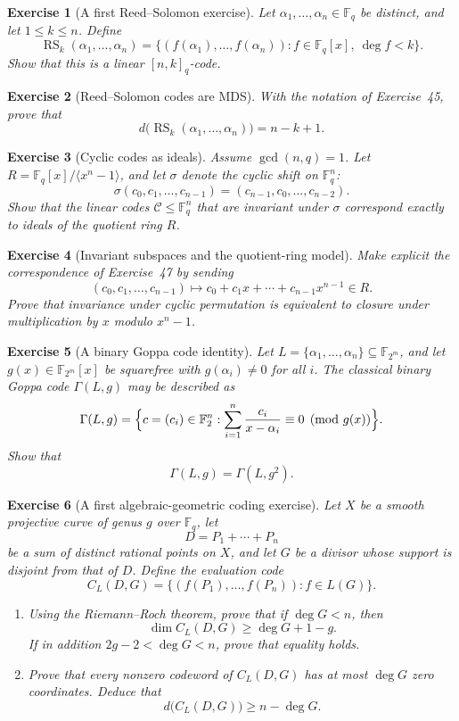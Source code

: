 \documentclass[11pt]{amsbook}
\theoremstyle{exstyle}
\newtheorem{exercise}{Exercise}
\theoremstyle{plain}
\newcommand{\F}{\mathbb{F}}
\newcommand{\Ccal}{\mathcal{C}}
\begin{document}
\begin{exercise}[A first Reed--Solomon exercise]
Let $\alpha_1,\dots,\alpha_n\in\F_q$ be distinct, and let $1\leq k\leq n$. Define
\[
\operatorname{RS}_{k}(\alpha_1,\dots,\alpha_n)
 =\{(f(\alpha_1),\dots,f(\alpha_n)): f\in \F_q[x],\ \deg f<k\}.
\]
Show that this is a linear $[n,k]_q$-code.
\end{exercise}

\begin{exercise}[Reed--Solomon codes are MDS]
With the notation of Exercise~45, prove that
\[
d\bigl(\operatorname{RS}_k(\alpha_1,\dots,\alpha_n)\bigr)=n-k+1.
\]
\end{exercise}

\begin{exercise}[Cyclic codes as ideals]
Assume $\gcd(n,q)=1$. Let $R=\F_q[x]/\langle x^n-1\rangle$, and let $\sigma$ denote the cyclic shift on $\F_q^n$:
\[
\sigma(c_0,c_1,\dots,c_{n-1})=(c_{n-1},c_0,\dots,c_{n-2}).
\]
Show that the linear codes $\Ccal\leq\F_q^n$ that are invariant under $\sigma$ correspond exactly to ideals of the quotient ring $R$.
\end{exercise}

\begin{exercise}[Invariant subspaces and the quotient-ring model]
Make explicit the correspondence of Exercise~47 by sending
\[
(c_0,c_1,\dots,c_{n-1})\longmapsto c_0+c_1x+\cdots+c_{n-1}x^{n-1}\in R.
\]
Prove that invariance under cyclic permutation is equivalent to closure under multiplication by $x$ modulo $x^n-1$.
\end{exercise}

\begin{exercise}[A binary Goppa code identity]
Let $L=\{\alpha_1,\dots,\alpha_n\}\subseteq \F_{2^m}$, and let $g(x)\in \F_{2^m}[x]$ be squarefree with $g(\alpha_i)\neq 0$ for all $i$. The classical binary Goppa code $\Gamma(L,g)$ may be described as
\[
\Gamma(L,g)=\Bigl\{c=(c_i)\in\F_2^n:\sum_{i=1}^n \frac{c_i}{x-\alpha_i}\equiv 0\pmod{g(x)}\Bigr\}.
\]
Show that
\[
\Gamma(L,g)=\Gamma(L,g^2).
\]
\end{exercise}

\begin{exercise}[A first algebraic-geometric coding exercise]
Let $X$ be a smooth projective curve of genus $g$ over $\F_q$, let
\[
D=P_1+\cdots+P_n
\]
be a sum of distinct rational points on $X$, and let $G$ be a divisor whose support is disjoint from that of $D$. Define the evaluation code
\[
C_L(D,G)=\{(f(P_1),\dots,f(P_n)):f\in L(G)\}.
\]
\begin{enumerate}[label=\textup{(\arabic*)}]
\item Using the Riemann--Roch theorem, prove that if $\deg G<n$, then
\[
\dim C_L(D,G)\geq \deg G+1-g.
\]
If in addition $2g-2<\deg G<n$, prove that equality holds.
\item Prove that every nonzero codeword of $C_L(D,G)$ has at most $\deg G$ zero coordinates. Deduce that
\[
d\bigl(C_L(D,G)\bigr)\geq n-\deg G.
\]
\end{enumerate}
\end{exercise}
\end{document}
